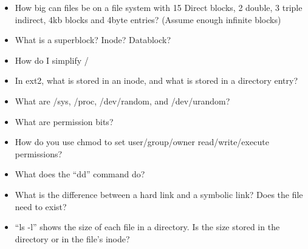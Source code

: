 \begin{itemize}
\tightlist
\item
  How big can files be on a file system with 15 Direct blocks, 2 double, 3 triple indirect, 4kb blocks and 4byte entries? (Assume enough infinite blocks)
\item
  What is a superblock? Inode? Datablock?
\item
  How do I simplify /
\item
  In ext2, what is stored in an inode, and what is stored in a directory entry?
\item
  What are /sys, /proc, /dev/random, and /dev/urandom?
\item
  What are permission bits?
\item
  How do you use chmod to set user/group/owner read/write/execute permissions?
\item
  What does the ``dd'' command do?
\item
  What is the difference between a hard link and a symbolic link? Does the file need to exist?
\item
  ``ls -l'' shows the size of each file in a directory. Is the size stored in the directory or in the file's inode?
\end{itemize}



